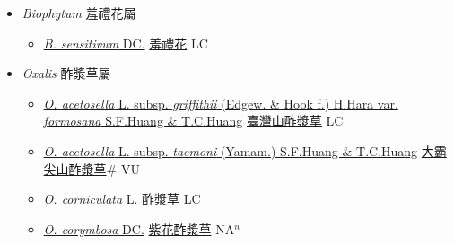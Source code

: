 
  \begin{itemize}
 \item[] \textit{Biophytum} 羞禮花屬
                    
  \begin{itemize}
        \item[] \href{http://www.theplantlist.org/tpl1.1/search?q=Biophytum+sensitivum}{\textit{B. sensitivum} DC.}   \href{\detokenize{http://taibnet.sinica.edu.tw/chi/taibnet_species_list.php?T2=羞禮花&T2_new_value=true&fr=y}}{羞禮花} LC
  \end{itemize}
 \item[] \textit{Oxalis} 酢漿草屬
                    
  \begin{itemize}
        \item[] \href{http://www.theplantlist.org/tpl1.1/search?q=Oxalis+acetosella+subsp.+griffithii+var.+formosana}{\textit{O. acetosella} L. subsp. \textit{griffithii} (Edgew. \& Hook f.) H.Hara var. \textit{formosana} S.F.Huang \& T.C.Huang}   \href{\detokenize{http://taibnet.sinica.edu.tw/chi/taibnet_species_list.php?T2=臺灣山酢漿草&T2_new_value=true&fr=y}}{臺灣山酢漿草} LC
        \item[] \href{http://www.theplantlist.org/tpl1.1/search?q=Oxalis+acetosella+subsp.+taemoni}{\textit{O. acetosella} L. subsp. \textit{taemoni} (Yamam.) S.F.Huang \& T.C.Huang}   \href{\detokenize{http://taibnet.sinica.edu.tw/chi/taibnet_species_list.php?T2=大霸尖山酢漿草&T2_new_value=true&fr=y}}{大霸尖山酢漿草}\# VU
        \item[] \href{http://www.theplantlist.org/tpl1.1/search?q=Oxalis+corniculata}{\textit{O. corniculata} L.}   \href{\detokenize{http://taibnet.sinica.edu.tw/chi/taibnet_species_list.php?T2=酢漿草&T2_new_value=true&fr=y}}{酢漿草} LC
        \item[] \href{http://www.theplantlist.org/tpl1.1/search?q=Oxalis+corymbosa}{\textit{O. corymbosa} DC.}   \href{\detokenize{http://taibnet.sinica.edu.tw/chi/taibnet_species_list.php?T2=紫花酢漿草&T2_new_value=true&fr=y}}{紫花酢漿草} NA$^n$
  \end{itemize}
  \end{itemize}

